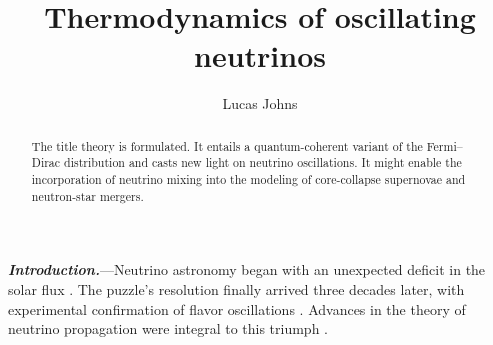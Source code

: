 \documentclass[aps,prl,twocolumn,groupedaddress]{revtex4-2}
\begin{document}

\title{Thermodynamics of oscillating neutrinos}


\author{Lucas Johns}



\begin{abstract}
The title theory is formulated. It entails a quantum-coherent variant of the Fermi--Dirac distribution and casts new light on neutrino oscillations. It might enable the incorporation of neutrino mixing into the modeling of core-collapse supernovae and neutron-star mergers.
\end{abstract}



\maketitle







\textbf{\textit{Introduction.}}---Neutrino astronomy began with an unexpected deficit in the solar flux \cite{bahcall1976}. The puzzle's resolution finally arrived three decades later, with experimental confirmation of flavor oscillations \cite{davis2003, koshiba2003, kajita2016, mcdonald2016}. Advances in the theory of neutrino propagation were integral to this triumph \cite{gribov1969, nussinov1976, wolfenstein1978, mikheyev1985, bethe1986, haxton1986, parke1986, kuo1989}.
\end{document}
